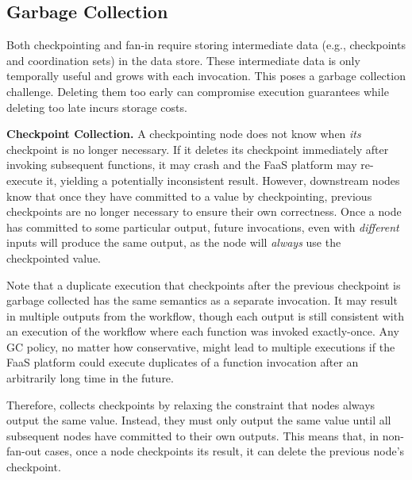\subsection{Garbage Collection}\label{sec:design:garbage}

Both checkpointing and fan-in require storing intermediate data (e.g.,
checkpoints and coordination sets) in the data store. These intermediate data
is only temporally useful and grows with each invocation. This poses a garbage
collection challenge. Deleting them too early can compromise execution
guarantees while deleting too late incurs storage costs.


\textbf{Checkpoint Collection.} A checkpointing node does not know when
\emph{its} checkpoint is no longer necessary.  If it deletes its checkpoint
immediately after invoking subsequent functions, it may crash and the FaaS
platform may re-execute it, yielding a potentially inconsistent result.
However, downstream nodes know that once they have committed to a value by
checkpointing, previous checkpoints are no longer necessary to ensure their
own correctness. Once a node has committed to some particular output, future
invocations, even with \emph{different} inputs will produce the same output,
as the node will \emph{always} use the checkpointed value.

Note that a duplicate execution that checkpoints after the previous checkpoint
is garbage collected has the same semantics as a separate invocation. It may
result in multiple outputs from the workflow, though each output is still
consistent with an execution of the workflow where each function was invoked
exactly-once. Any GC policy, no matter how conservative, might lead to
multiple executions if the FaaS platform could execute duplicates of a
function invocation after an arbitrarily long time in the future.

Therefore, \name{} collects checkpoints by relaxing the constraint that
nodes always output the same value. Instead, they must only output the same
value until all subsequent nodes have committed to their own outputs. This
means that, in non-fan-out cases, once a node checkpoints its result, it can
delete the previous node's checkpoint.

